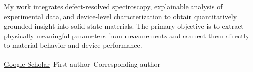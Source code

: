 \documentclass[11pt, a4paper]{awesome-cv}
\begin{document}
\begin{cvparagraph}
My work integrates defect-resolved spectroscopy, explainable analysis of experimental data, and device-level characterization to obtain quantitatively grounded insight into solid-state materials. The primary objective is to extract physically meaningful parameters from measurements and connect them directly to material behavior and device performance.
\end{cvparagraph}


\begin{cvparagraph}
\href{https://scholar.google.co.kr/citations?user=MZE2mWsAAAAJ}{Google Scholar} \quad\textbar\quad \textsuperscript{\dag}\,First author \quad *\,Corresponding author
\end{cvparagraph}

\providecommand{\me}[1]{\textbf{\uline{#1}}}

\setcounter{pubnum}{11}  %
\providecommand{\pub}[5]{%
  \addtocounter{pubnum}{-1}%
  \item[\textbf{\arabic{pubnum}.}] {#1, ``#2,'' \textit{#3}, (#4), \href{https://doi.org/#5}{\nolinkurl{DOI:#5}}}%
}
\providecommand{\publink}[6]{%
  \addtocounter{pubnum}{-1}%
  \item[\textbf{\arabic{pubnum}.}] {#1, ``#2,'' \textit{#3}, (#4), \href{#5}{#6}}%
}
\end{document}
